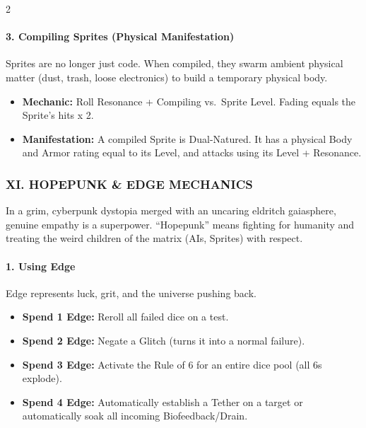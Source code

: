\documentclass[
  oneside]{article}
\providecommand{\tightlist}{%
  \setlength{\itemsep}{0pt}\setlength{\parskip}{0pt}}
\begin{document}
\begin{multicols}{2}

\hypertarget{compiling-sprites-physical-manifestation}{%
\paragraph{3. Compiling Sprites (Physical
Manifestation)}\label{compiling-sprites-physical-manifestation}}

Sprites are no longer just code. When compiled,
they swarm ambient physical matter (dust, trash,
loose electronics) to build a temporary physical
body.

\begin{itemize}
\tightlist
\item
  \textbf{Mechanic:} Roll Resonance + Compiling
  vs.~Sprite Level. Fading equals the Sprite's
  hits x 2.
\item
  \textbf{Manifestation:} A compiled Sprite is
  Dual-Natured. It has a physical Body and Armor
  rating equal to its Level, and attacks using its
  Level + Resonance.
\end{itemize}

\hypertarget{xi.-hopepunk-edge-mechanics}{%
\subsubsection{XI. HOPEPUNK \& EDGE
MECHANICS}\label{xi.-hopepunk-edge-mechanics}}

In a grim, cyberpunk dystopia merged with an
uncaring eldritch gaiasphere, genuine empathy is a
superpower. ``Hopepunk'' means fighting for
humanity and treating the weird children of the
matrix (AIs, Sprites) with respect.

\hypertarget{using-edge}{%
\paragraph{1. Using Edge}\label{using-edge}}

Edge represents luck, grit, and the universe
pushing back.

\begin{itemize}
\tightlist
\item
  \textbf{Spend 1 Edge:} Reroll all failed dice on
  a test.
\item
  \textbf{Spend 2 Edge:} Negate a Glitch (turns it
  into a normal failure).
\item
  \textbf{Spend 3 Edge:} Activate the Rule of 6
  for an entire dice pool (all 6s explode).
\item
  \textbf{Spend 4 Edge:} Automatically establish a
  Tether on a target or automatically soak all
  incoming Biofeedback/Drain.
\end{itemize}


\end{multicols}
\end{document}
